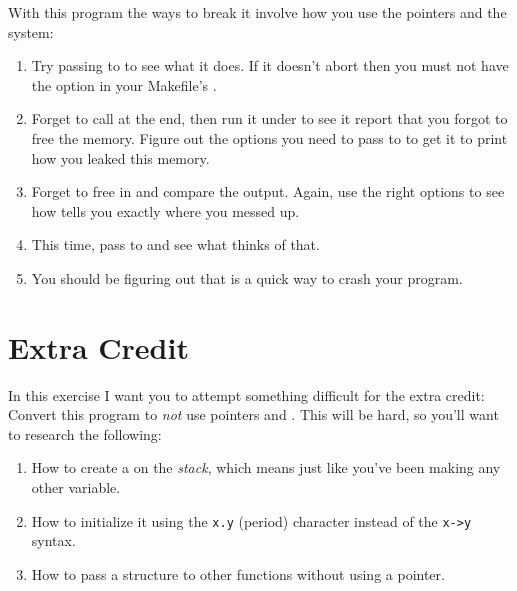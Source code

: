 With this program the ways to break it involve how you use
the pointers and the  system:

\begin{enumerate}
\item Try passing  to  to see what
    it does.  If it doesn't abort then you must not have the
     option in your Makefile's .
\item Forget to call  at the end, then run
    it under  to see it report that you forgot
    to free the memory.  Figure out the options you need to pass
    to  to get it to print how you leaked
    this memory.
\item Forget to free  in 
    and compare the output.  Again, use the right options to 
    see how  tells you exactly where you messed
    up.
\item This time, pass  to  and
    see what  thinks of that.
\item You should be figuring out that  is a quick way
    to crash your program.
\end{enumerate}

\section{Extra Credit}

In this exercise I want you to attempt something difficult for
the extra credit:  Convert this program to \emph{not} use pointers
and .  This will be hard, so you'll want to research
the following:

\begin{enumerate}
\item How to create a  on the \emph{stack}, which
    means just like you've been making any other variable.
\item How to initialize it using the \verb|x.y| (period) character
    instead of the \verb|x->y| syntax.
\item How to pass a structure to other functions without using
    a pointer.
\end{enumerate}

